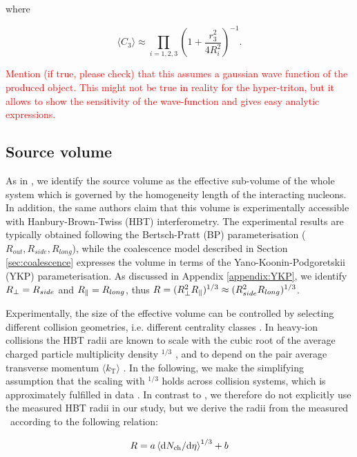\documentclass[a4paper,11pt]{scrartcl} %
\begin{document}
 where

 \begin{equation}
\langle C_{3} \rangle \approx \prod_{i=1,2,3} \left(1 + \frac{r_{3}^2}{4R_{i}^2} \right)^{-1}.
\label{eq:C3}
\end{equation}
 
 \textcolor{red}{Mention (if true, please check) that this assumes a gaussian wave function of the produced object. This might not be true in reality for the hyper-triton, but it allows to show the sensitivity of the wave-function and gives easy analytic expressions.}

\subsection{Source volume}
\label{SecSourceVolume}
As in \cite{Scheibl:1998tk}, we identify the source volume as the effective sub-volume of the whole system which is governed by the homogeneity length of the interacting nucleons. In addition, the same authors claim that this volume is experimentally accessible with Hanbury-Brown-Twiss (HBT) interferometry. 
The experimental results are typically obtained following the Bertsch-Pratt (BP) parameterisation ($R_{out}, R_{side}, R_{long}$), while the coalescence model described in Section \ref{sec:coalescence} expresses the volume in terms of the Yano-Koonin-Podgoretskii (YKP) parameterisation. As discussed in Appendix \ref{appendix:YKP}, we identify $R_{\perp} = R_{side}$ and $R_{\|} = R_{long}$, thus $R = (R_{\perp}^{2}R_{\|})^{1/3} \approx (R_{side}^{2}R_{long})^{1/3}$.

Experimentally, the size of the effective volume can be controlled by selecting different collision geometries, i.e. different centrality classes \cite{Abelev:2013qoq}. In heavy-ion collisions the HBT radii are known to scale with the cubic root of the average charged particle multiplicity density \avdNdeta$^{1/3}$ \cite{Adam:2015vna}, and to depend on the pair average transverse momentum $\langle k_{\mathrm{T}}\rangle$ \cite{Aamodt:2011mr}. In the following, we make the simplifying assumption that the scaling with \avdNdeta$^{1/3}$ holds across collision systems, which is approximately fulfilled in data \cite{Adam:2015pya}. In contrast to \cite{Blum:2017qnn}, we therefore do not explicitly use the measured HBT radii in our study, but we derive the radii from the measured \avdNdeta~according to the following relation:

\begin{equation}
R = a \left<\mathrm{d}N_\mathrm{ch}/\mathrm{d}\eta\right>^{1/3} + b
\label{eq:radiusParameterisation}
\end{equation}
\end{document}
